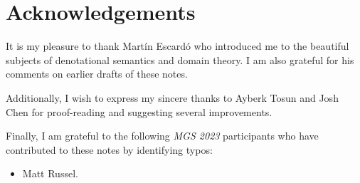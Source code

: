 \chapter{Acknowledgements}

It is my pleasure to thank Mart\'in Escard\'o who introduced me to the beautiful
subjects of denotational semantics and domain theory. I am also grateful for his
comments on earlier drafts of these notes.

Additionally, I wish to express my sincere thanks to Ayberk Tosun and Josh Chen
for proof-reading and suggesting several improvements.

Finally, I am grateful to the following \emph{MGS 2023} participants who have
contributed to these notes by identifying typos:

\begin{itemize}
\item Matt Russel.
\end{itemize}


